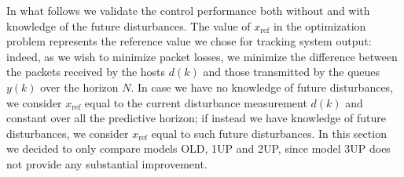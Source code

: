 In what follows we validate the control performance both without and with knowledge of the future disturbances. The value of $x_\mathrm{ref}$ in the optimization problem represents the reference value we chose for tracking system output: indeed, as we wish to minimize packet losses, we minimize the difference between the packets received by the hosts $d(k)$ and those transmitted by the queues $y(k)$ over the horizon $N$. In case we have no knowledge of future disturbances, we consider $x_\mathrm{ref}$ equal to the current disturbance  measurement $d(k)$ and constant over all the predictive horizon; if instead we have knowledge of future disturbances, we consider $x_\mathrm{ref}$ equal to such future disturbances. In this section we decided to only compare models OLD, 1UP and 2UP, since model 3UP does not provide any substantial improvement. 

